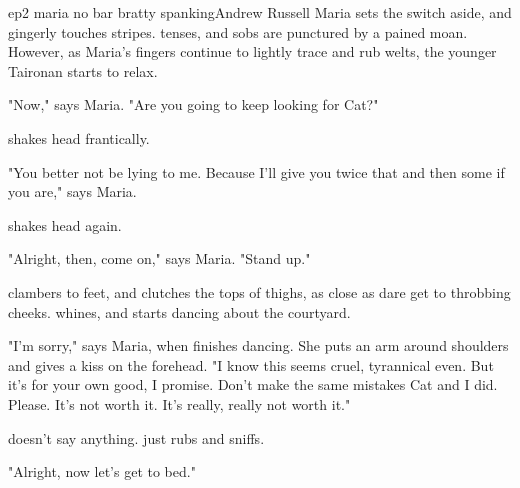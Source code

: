 \documentclass{book}
\begin{document}
\begin{childnode}{ep2 maria no bar bratty spanking}{Andrew Russell}
    Maria sets the switch aside, and gingerly touches \names{} stripes. \name{} tenses, and \hisher{} sobs are punctured by a pained moan. However, as Maria's fingers continue to lightly trace and
    rub \names{} welts, the younger Taironan starts to relax.

    "Now," says Maria. "Are you going to keep looking for Cat?"

    \name{} shakes \hisher{} head frantically.

    "You better not be lying to me. Because I'll give you twice that and then some if you are," says Maria.

    \name{} shakes \hisher{} head again.

    "Alright, then, come on," says Maria. "Stand up."

    \name{} clambers to \hisher{} feet, and clutches the tops of \hisher{} thighs, as close as \heshe{} dare get to \hisher{} throbbing cheeks. \HeShe{} whines, and starts dancing
    about the courtyard.

    "I'm sorry," says Maria, when \name{} finishes dancing. She puts an arm around \names{} shoulders and gives \himher{} a kiss on the forehead. "I know this seems cruel, tyrannical even. But it's for your own good, I promise. Don't make the same mistakes Cat and I 
    did. Please. It's not worth it. It's really, really not worth it." 
        
    \name{} doesn't say anything. \HeShe{} just rubs and sniffs.

    "Alright, now let's get to bed."



\end{childnode}
\end{document}
